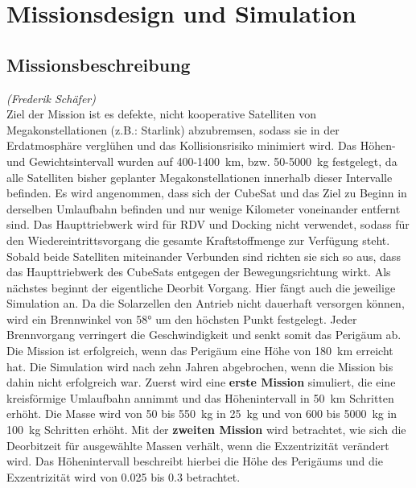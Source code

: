 \chapter{Missionsdesign und Simulation}


\section{Missionsbeschreibung}
\hfill\emph{(Frederik Schäfer)}\\	
	Ziel der Mission ist es defekte, nicht kooperative Satelliten von Megakonstellationen (z.B.: Starlink) abzubremsen, sodass sie in der Erdatmosphäre verglühen und das Kollisionsrisiko minimiert wird. Das Höhen- und Gewichtsintervall wurden auf \num{400}-\SI{1400}{\kilo\metre}, bzw. \num{50}-\SI{5000}{\kilogram} festgelegt, da alle Satelliten bisher geplanter Megakonstellationen innerhalb dieser Intervalle befinden.
Es wird angenommen, dass sich der CubeSat und das Ziel zu Beginn in derselben Umlaufbahn befinden und nur wenige Kilometer voneinander entfernt sind. Das Haupttriebwerk wird für RDV und Docking nicht verwendet, sodass für den Wiedereintrittsvorgang die gesamte Kraftstoffmenge zur Verfügung steht. Sobald beide Satelliten miteinander Verbunden sind richten sie sich so aus, dass das Haupttriebwerk des CubeSats entgegen der Bewegungsrichtung wirkt. Als nächstes beginnt der eigentliche Deorbit Vorgang. Hier fängt auch die jeweilige Simulation an. Da die Solarzellen den Antrieb nicht dauerhaft versorgen können, wird ein Brennwinkel von \num{58}° um den höchsten Punkt festgelegt. Jeder Brennvorgang verringert die Geschwindigkeit und senkt somit das Perigäum ab. Die Mission ist erfolgreich, wenn das Perigäum eine Höhe von \SI{180}{\kilo\metre} erreicht hat. Die Simulation wird nach zehn Jahren abgebrochen, wenn die Mission bis dahin nicht erfolgreich war. 
Zuerst wird eine \textbf{erste Mission} simuliert, die eine kreisförmige Umlaufbahn annimmt und das Höhenintervall in \SI{50}{\kilo\metre} Schritten erhöht. Die Masse wird von \num{50} bis \SI{550}{\kilogram} in \SI{25}{\kilogram} und von \num{600} bis \SI{5000}{\kilogram} in \SI{100}{\kilogram} Schritten erhöht.
Mit der \textbf{zweiten Mission} wird betrachtet, wie sich die Deorbitzeit für ausgewählte Massen verhält, wenn die Exzentrizität verändert wird. Das Höhenintervall beschreibt hierbei die Höhe des Perigäums und die Exzentrizität wird von \num{0.025} bis \num{0.3} betrachtet.
	
